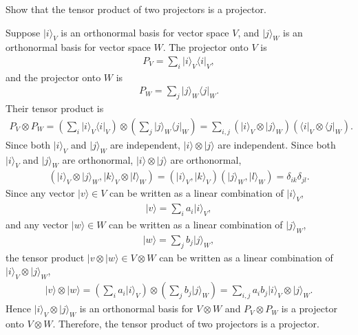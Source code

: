 \documentclass[en]{sol-man}
\begin{document}
\begin{exe}
    Show that the tensor product of two projectors is a projector.
\end{exe}
\begin{pf}
    Suppose $\lvert i\rangle_V$ is an orthonormal basis for vector space $V$, and $\lvert j\rangle_W$ is an orthonormal basis for vector space $W$. The projector onto $V$ is
    \begin{align}
        P_V=\sum_i\lvert i\rangle_V\langle i\lvert_V,
    \end{align}
    and the projector onto $W$ is
    \begin{align}
        P_W=\sum_j\lvert j\rangle_W\langle j\lvert_W.
    \end{align}
    Their tensor product is
    \begin{align}
        P_V\otimes P_W=\left(\sum_i\lvert i\rangle_V\langle i\lvert_V\right)\otimes\left(\sum_j\lvert j\rangle_W\langle j\lvert_W\right)=\sum_{i,j}(\lvert i\rangle_V\otimes\lvert j\rangle_W)(\langle i\rvert_V\otimes\langle j\rvert_W).
    \end{align}
    Since both $\lvert i\rangle_V$ and $\lvert j\rangle_W$ are independent, $\lvert i\rangle\otimes\lvert j\rangle$ are independent. Since both $\lvert i\rangle_V$ and $\lvert j\rangle_W$ are orthonormal, $\lvert i\rangle\otimes\lvert j\rangle$ are orthonormal,
    \begin{align}
        (\vert i\rangle_V\otimes\lvert j\rangle_W,\lvert k\rangle_V\otimes\lvert l\rangle_W)=(\lvert i\rangle_V,\lvert k\rangle_V)(\lvert j\rangle_W,\lvert l\rangle_W)=\delta_{ik}\delta_{jl}.
    \end{align}
    Since any vector $\lvert v\rangle\in V$ can be written as a linear combination of $\lvert i\rangle_V$,
    \begin{align}
        \lvert v\rangle=\sum_ia_i\lvert i\rangle_V,
    \end{align}
    and any vector $\lvert w\rangle\in W$ can be written as a linear combination of $\lvert j\rangle_W$,
    \begin{align}
        \lvert w\rangle=\sum_jb_j\lvert j\rangle_W,
    \end{align}
    the tensor product $\lvert v\otimes\lvert w\rangle\in V\otimes W$ can be written as a linear combination of $\lvert i\rangle_V\otimes\lvert j\rangle_W$,
    \begin{align}
        \lvert v\rangle\otimes\lvert w\rangle=\left(\sum_ia_i\lvert i\rangle_V\right)\otimes\left(\sum_jb_j\lvert j\rangle_W\right)=\sum_{i,j}a_ib_j\lvert i\rangle_V\otimes\lvert j\rangle_W.
    \end{align}
    Hence $\lvert i\rangle_V\otimes\lvert j\rangle_W$ is an orthonormal basis for $V\otimes W$ and $P_V\otimes P_W$ is a projector onto $V\otimes W$. Therefore, the tensor product of two projectors is a projector.
\end{pf}
\end{document}
